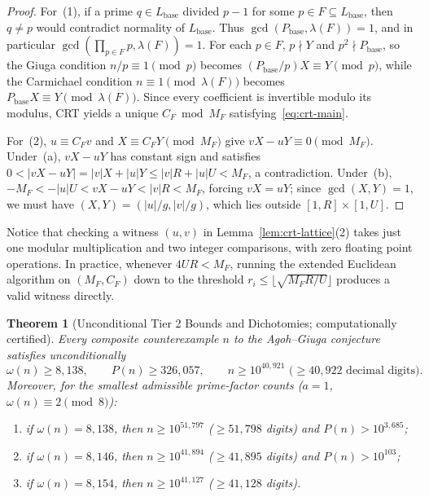 \documentclass[11pt]{article}
\newtheorem{theorem}{Theorem}[section]
\theoremstyle{remark}
\begin{document}
\begin{proof}
For~(1), if a prime $q \in L_{\mathrm{base}}$ divided $p - 1$ for some
$p \in F \subseteq L_{\mathrm{base}}$, then $q \neq p$ would contradict normality
of $L_{\mathrm{base}}$. Thus $\gcd(P_{\mathrm{base}}, \lambda(F)) = 1$, and in
particular $\gcd(\prod_{p\in F} p, \lambda(F)) = 1$. For each $p \in F$, $p \nmid Y$
and $p^2 \nmid P_{\mathrm{base}}$, so the Giuga condition $n/p \equiv 1 \pmod p$
becomes $(P_{\mathrm{base}}/p) X \equiv Y \pmod p$, while the Carmichael
condition $n \equiv 1 \pmod{\lambda(F)}$ becomes
$P_{\mathrm{base}} X \equiv Y \pmod{\lambda(F)}$. Since every coefficient is
invertible modulo its modulus, CRT yields a unique $C_F \bmod M_F$ satisfying~\eqref{eq:crt-main}.

For~(2), $u \equiv C_F v$ and $X \equiv C_F Y \pmod{M_F}$ give
$vX - uY \equiv 0 \pmod{M_F}$. Under~(a), $vX - uY$ has constant sign and
satisfies $0 < |vX - uY| = |v|X + |u|Y \le |v|R + |u|U < M_F$, a contradiction.
Under~(b), $-M_F < -|u|U < vX - uY < |v|R < M_F$, forcing $vX = uY$; since
$\gcd(X,Y) = 1$, we must have $(X,Y) = (|u|/g, |v|/g)$, which lies outside
$[1,R]\times [1,U]$.
\end{proof}

Notice that checking a witness $(u,v)$ in Lemma~\ref{lem:crt-lattice}(2) takes
just one modular multiplication and two integer comparisons, with zero floating
point operations. In practice, whenever $4UR < M_F$, running the extended
Euclidean algorithm on $(M_F, C_F)$ down to the threshold
$r_i \le \lfloor \sqrt{M_F R / U}\rfloor$ produces a valid witness directly.

\begin{theorem}[Unconditional Tier 2 Bounds and Dichotomies; computationally certified]
\label{thm:tier2}
Every composite counterexample $n$ to the Agoh--Giuga conjecture satisfies
unconditionally
\[
  \omega(n) \ge 8{,}138,
  \qquad
  P(n) \ge 326{,}057,
  \qquad
  n \ge 10^{40{,}921} \text{ ($\ge 40{,}922$ decimal digits)}.
\]
Moreover, for the smallest admissible prime-factor counts ($a = 1$,
$\omega(n) \equiv 2 \pmod 8$):
\begin{enumerate}
  \item if $\omega(n) = 8{,}138$, then $n \ge 10^{51{,}797}$ ($\ge 51{,}798$
  digits) and $P(n) > 10^{3{,}685}$;
  \item if $\omega(n) = 8{,}146$, then $n \ge 10^{41{,}894}$ ($\ge 41{,}895$
  digits) and $P(n) > 10^{103}$;
  \item if $\omega(n) = 8{,}154$, then $n \ge 10^{41{,}127}$ ($\ge 41{,}128$
  digits).
\end{enumerate}
\end{theorem}
\end{document}
